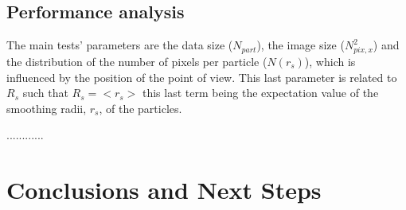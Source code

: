 \documentclass[11pt]{article}
\begin{document}

\subsection{Performance analysis}

The main tests' parameters are the data size ($N_{part}$),
the image size ($N_{pix,x}^2$) and the distribution of the number of pixels 
per particle ($N(r_s)$), which is influenced by the position of the point of view.
This last parameter is related to $R_s$ such that $R_s = <r_s>$ this last term 
being the expectation value of the smoothing radii, $r_s$, of the particles.

............


\section{Conclusions and Next Steps}
\end{document}

